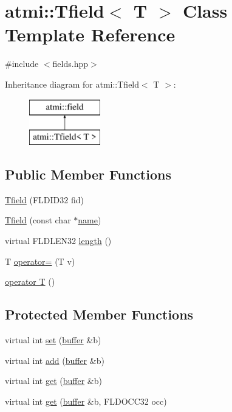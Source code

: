 \hypertarget{classatmi_1_1_tfield}{}\section{atmi\+:\+:Tfield$<$ T $>$ Class Template Reference}
\label{classatmi_1_1_tfield}


{\ttfamily \#include $<$fields.\+hpp$>$}

Inheritance diagram for atmi\+:\+:Tfield$<$ T $>$\+:\begin{figure}[H]
\begin{center}
\leavevmode
\includegraphics[height=2.000000cm]{classatmi_1_1_tfield}
\end{center}
\end{figure}
\subsection*{Public Member Functions}
\begin{DoxyCompactItemize}
\item 
\hyperlink{classatmi_1_1_tfield_a7bf54162e43037ffb34692409d45241b}{Tfield} (F\+L\+D\+I\+D32 fid)
\item 
\hyperlink{classatmi_1_1_tfield_a9718a2fcffa95fda6e31f18815d05dbe}{Tfield} (const char $\ast$\hyperlink{classatmi_1_1field_a0fbc5a958a0af8286e339b088ee69bc8}{name})
\item 
virtual F\+L\+D\+L\+E\+N32 \hyperlink{classatmi_1_1_tfield_a6138c508841c4a837ea8c8e089755278}{length} ()
\item 
T \hyperlink{classatmi_1_1_tfield_a7903e881d35805b1477b1ef8f2928f4e}{operator=} (T v)
\item 
\hyperlink{classatmi_1_1_tfield_ad8b13cf9dc43ad4a896ab96a1aefb31f}{operator T} ()
\end{DoxyCompactItemize}
\subsection*{Protected Member Functions}
\begin{DoxyCompactItemize}
\item 
virtual int \hyperlink{classatmi_1_1_tfield_a7bd1997e976116990ad0e2072320db77}{set} (\hyperlink{classatmi_1_1buffer}{buffer} \&b)
\item 
virtual int \hyperlink{classatmi_1_1_tfield_a4962b3aa080aba4ecffc7f3fa98be2da}{add} (\hyperlink{classatmi_1_1buffer}{buffer} \&b)
\item 
virtual int \hyperlink{classatmi_1_1_tfield_aa70ce8893913c8f3d968cae72f2cdd11}{get} (\hyperlink{classatmi_1_1buffer}{buffer} \&b)
\item 
virtual int \hyperlink{classatmi_1_1_tfield_ae8de2dd360d04fc2465e4169b239c222}{get} (\hyperlink{classatmi_1_1buffer}{buffer} \&b, F\+L\+D\+O\+C\+C32 occ)
\end{DoxyCompactItemize}

